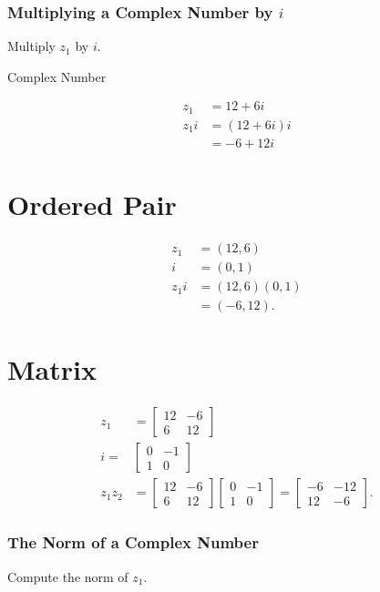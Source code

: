 \subsubsection{Multiplying a Complex Number by $i$}
Multiply $z_{1}$ by $i$.

Complex Number

$$
\begin{aligned}
z_{1} & =12+6 i \\
z_{1} i & =(12+6 i) i \\
& =-6+12 i
\end{aligned}
$$

\section{Ordered Pair}
$$
\begin{aligned}
z_{1} & =(12,6) \\
i & =(0,1) \\
z_{1} i & =(12,6)(0,1) \\
& =(-6,12) .
\end{aligned}
$$

\section{Matrix}
$$
\begin{aligned}
z_{1} & =\left[\begin{array}{cc}
12 & -6 \\
6 & 12
\end{array}\right] \\
i= & {\left[\begin{array}{cc}
0 & -1 \\
1 & 0
\end{array}\right] } \\
z_{1} z_{2} & =\left[\begin{array}{cc}
12 & -6 \\
6 & 12
\end{array}\right]\left[\begin{array}{cc}
0 & -1 \\
1 & 0
\end{array}\right]=\left[\begin{array}{cc}
-6 & -12 \\
12 & -6
\end{array}\right] .
\end{aligned}
$$

\subsubsection{The Norm of a Complex Number}
Compute the norm of $z_{1}$.

